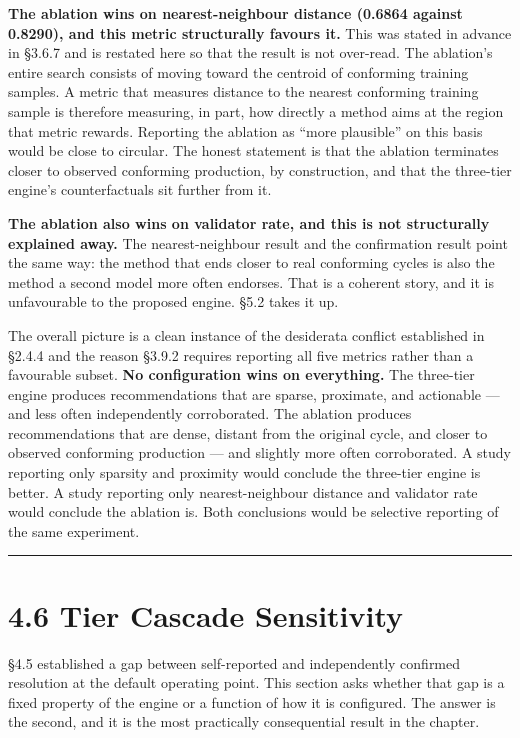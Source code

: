 \textbf{The ablation wins on nearest-neighbour distance (0.6864 against 0.8290), and this metric structurally favours it.} This was stated in advance in §3.6.7 and is restated here so that the result is not over-read. The ablation's entire search consists of moving toward the centroid of conforming training samples. A metric that measures distance to the nearest conforming training sample is therefore measuring, in part, how directly a method aims at the region that metric rewards. Reporting the ablation as ``more plausible'' on this basis would be close to circular. The honest statement is that the ablation terminates closer to observed conforming production, by construction, and that the three-tier engine's counterfactuals sit further from it.

\textbf{The ablation also wins on validator rate, and this is not structurally explained away.} The nearest-neighbour result and the confirmation result point the same way: the method that ends closer to real conforming cycles is also the method a second model more often endorses. That is a coherent story, and it is unfavourable to the proposed engine. §5.2 takes it up.

The overall picture is a clean instance of the desiderata conflict established in §2.4.4 and the reason §3.9.2 requires reporting all five metrics rather than a favourable subset. \textbf{No configuration wins on everything.} The three-tier engine produces recommendations that are sparse, proximate, and actionable --- and less often independently corroborated. The ablation produces recommendations that are dense, distant from the original cycle, and closer to observed conforming production --- and slightly more often corroborated. A study reporting only sparsity and proximity would conclude the three-tier engine is better. A study reporting only nearest-neighbour distance and validator rate would conclude the ablation is. Both conclusions would be selective reporting of the same experiment.

\begin{center}\rule{0.5\linewidth}{0.5pt}\end{center}

\hypertarget{tier-cascade-sensitivity}{%
\section{4.6 Tier Cascade Sensitivity}\label{tier-cascade-sensitivity}}

§4.5 established a gap between self-reported and independently confirmed resolution at the default operating point. This section asks whether that gap is a fixed property of the engine or a function of how it is configured. The answer is the second, and it is the most practically consequential result in the chapter.

